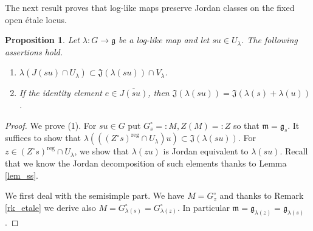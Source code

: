 \documentclass[12pt]{amsart}
\newtheorem{Proposition}[Theorem]{Proposition}
\theoremstyle{definition}
\theoremstyle{remark}
\newcommand{\g}{\mathfrak{g}}
\newcommand{\m}{\mathfrak{m}}
\newcommand{\J}{\mathfrak{J}}
\newcommand{\reg}{{\operatorname{reg}}}
\begin{document}
The next result proves that log-like maps  preserve Jordan classes on the fixed open \'etale locus.
\begin{Proposition} \label{prop_respect}
Let $\lambda \colon G \to \g$ be a log-like map and let $su \in U_\lambda$.
The following assertions hold.
\begin{enumerate}[label=(\arabic*)]
\item $\lambda( J(su) \cap U_\lambda) \subset \J(\lambda(su)) \cap V_\lambda$.
\item If the identity element $e \in \overline{J(su)}$, then $\J(\lambda(su)) = \J(\lambda(s) + \lambda(u))$.
\end{enumerate}
\end{Proposition}
\begin{proof}
We prove (1). For $su \in G$ put $G_s^\circ =: M, Z(M) =: Z$ so that $\m = \g_s$.
It suffices to show that $\lambda(((Z^\circ s)^\reg \cap U_\lambda) u) \subset \J(\lambda(su))$.
For $z \in (Z^\circ s)^\reg \cap U_\lambda$, we  show that $\lambda(zu)$ is Jordan equivalent to $\lambda(su)$.
Recall that we know the Jordan decomposition of such elements thanks to Lemma  \ref{lem_ss}.

We first deal with the semisimple part.
We have $M = G_z^\circ$ and thanks to  Remark \ref{rk_etale} we derive also $M = G_{\lambda(s)}^\circ = G_{\lambda(z)}^\circ$.
In particular $\m = \g_{\lambda(z)} = \g_{\lambda(s)}$.


\end{proof}
\end{document}
